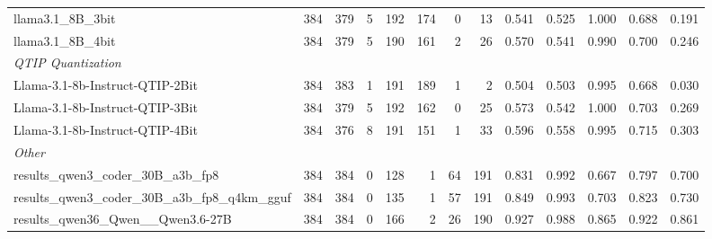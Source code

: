 \begin{table}[htbp]
{\begin{tabular}{lrrrrrrrrrrrr}
    \midrule
    llama3.1\_8B\_3bit & 384 & 379 & 5 & 192 & 174 & 0 & 13 & 0.541 & 0.525 & 1.000 & 0.688 & 0.191 \\
    llama3.1\_8B\_4bit & 384 & 379 & 5 & 190 & 161 & 2 & 26 & 0.570 & 0.541 & 0.990 & 0.700 & 0.246 \\
    \midrule
    \multicolumn{13}{l}{\textit{QTIP Quantization}} \\
    \midrule
    Llama-3.1-8b-Instruct-QTIP-2Bit & 384 & 383 & 1 & 191 & 189 & 1 & 2 & 0.504 & 0.503 & 0.995 & 0.668 & 0.030 \\
    Llama-3.1-8b-Instruct-QTIP-3Bit & 384 & 379 & 5 & 192 & 162 & 0 & 25 & 0.573 & 0.542 & 1.000 & 0.703 & 0.269 \\
    Llama-3.1-8b-Instruct-QTIP-4Bit & 384 & 376 & 8 & 191 & 151 & 1 & 33 & 0.596 & 0.558 & 0.995 & 0.715 & 0.303 \\
    \midrule
    \multicolumn{13}{l}{\textit{Other}} \\
    \midrule
    results\_qwen3\_coder\_30B\_a3b\_fp8 & 384 & 384 & 0 & 128 & 1 & 64 & 191 & 0.831 & 0.992 & 0.667 & 0.797 & 0.700 \\
    results\_qwen3\_coder\_30B\_a3b\_fp8\_q4km\_gguf & 384 & 384 & 0 & 135 & 1 & 57 & 191 & 0.849 & 0.993 & 0.703 & 0.823 & 0.730 \\
    results\_qwen36\_Qwen\_\_Qwen3.6-27B & 384 & 384 & 0 & 166 & 2 & 26 & 190 & 0.927 & 0.988 & 0.865 & 0.922 & 0.861 \\
    \bottomrule
  \end{tabular}
  }
\end{table}

